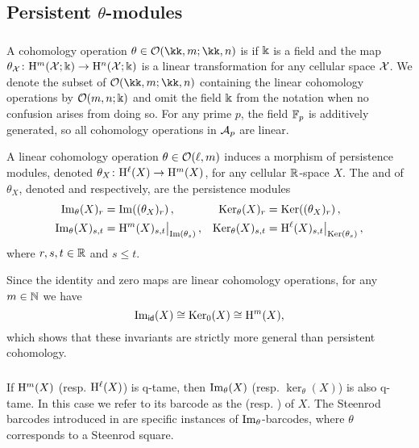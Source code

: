 
\subsection{Persistent $\theta$-modules}

\subsubsection{}\label{ss:theta-modules}

A cohomology operation $\theta \in \cO(\kk,m; \kk,n)$ is  if \(\Bbbk\) is a field and the map \(\theta_{\mathcal{X}} \colon \mathrm{H}^m(\mathcal{X}; \Bbbk) \to \mathrm{H}^n(\mathcal{X}; \Bbbk)\) is a linear transformation for any cellular space \(\mathcal{X}\).
We denote the subset of $\cO(\kk,m; \kk,n)$ containing the linear cohomology operations by $\mathcal{O}(m,n;\Bbbk)$ and omit the field \(\Bbbk\) from the notation when no confusion arises from doing so.
For any prime $p$, the field ${\mathbb{F}_p}$ is additively generated, so all cohomology operations in $\mathcal{A}_p$ are linear.

A linear cohomology operation \(\theta \in \mathcal{O}(\ell, m)\) induces a morphism of persistence modules, denoted \(\theta_X \colon \mathrm{H}^\ell(X) \to \mathrm{H}^m(X)\), for any cellular \(\mathbb{R}\)-space \(X\).
The  and  of $\theta_X$, denoted  and  respectively, are the persistence modules
\begin{align*}
	\operatorname{Im}_\theta(X)_r &= \operatorname{Im}((\theta_X)_r)\,, &
	\operatorname{Ker}_\theta(X)_r &= \operatorname{Ker}((\theta_X)_r)\,, \\
	\operatorname{Im}_\theta(X)_{s,t} &= \mathrm{H}^m(X)_{s,t}\big|_{\operatorname{Im}(\theta_s)}\,, &
	\operatorname{Ker}_\theta(X)_{s,t} &= \mathrm{H}^\ell(X)_{s,t}\big|_{\operatorname{Ker}(\theta_s)}\,,
\end{align*}
where \(r, s, t \in \mathbb{R}\) and \(s \leq t\).

Since the identity and zero maps are linear cohomology operations, for any \(m \in \mathbb{N}\) we have
\[
\operatorname{Im}_{\mathsf{id}}(X) \cong \operatorname{Ker}_0(X) \cong \mathrm{H}^m(X),
\]
which shows that these invariants are strictly more general than persistent cohomology.

\subsubsection{}\label{ss:theta-modules-q-tame}

If \(\mathrm{H}^m(X)\) (resp. \(\mathrm{H}^\ell(X)\)) is q-tame, then \(\operatorname{Im}_\theta(X)\) (resp. \(\ker_\theta(X)\)) is also q-tame.
In this case we refer to its barcode as the  (resp. ) of \(X\).
The Steenrod barcodes introduced in \cite{medina2022per_st} are specific instances of \(\operatorname{Im}_\theta\)-barcodes, where \(\theta\) corresponds to a Steenrod square.